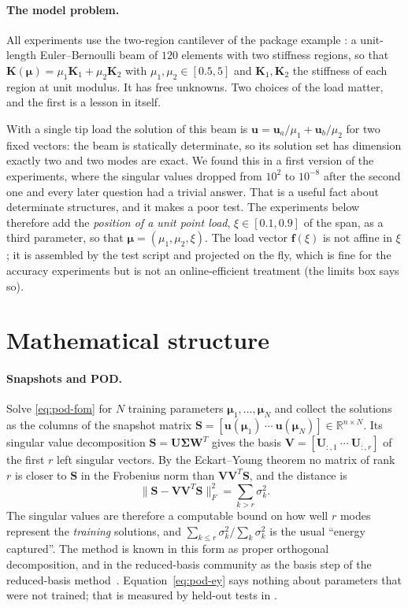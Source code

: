 \paragraph{The model problem.}
All experiments use the two-region cantilever of the package example : a unit-length Euler--Bernoulli beam of $120$ elements with two stiffness regions, so that $\bm K(\bm\mu)=\mu_1\bm K_1+\mu_2\bm K_2$ with $\mu_1,\mu_2\in[0.5,5]$ and $\bm K_1,\bm K_2$ the stiffness of each region at unit modulus. It has \cpdNFree free unknowns. Two choices of the load matter, and the first is a lesson in itself.

With a single tip load the solution of this beam is $\bm u=\bm u_a/\mu_1+\bm u_b/\mu_2$ for two fixed vectors: the beam is statically determinate, so its solution set has dimension exactly two and two modes are exact. We found this in a first version of the experiments, where the singular values dropped from $10^{2}$ to $10^{-8}$ after the second one and every later question had a trivial answer. That is a useful fact about determinate structures, and it makes a poor test. The experiments below therefore add the \emph{position of a unit point load}, $\xi\in[0.1,0.9]$ of the span, as a third parameter, so that $\bm\mu=(\mu_1,\mu_2,\xi)$. The load vector $\bm f(\xi)$ is not affine in $\xi$; it is assembled by the test script and projected on the fly, which is fine for the accuracy experiments but is not an online-efficient treatment (the limits box says so).

\section{Mathematical structure}\label{sec:pod-math}

\paragraph{Snapshots and POD.}
Solve \eqref{eq:pod-fom} for $N$ training parameters $\bm\mu_1,\dots,\bm\mu_N$ and collect the solutions as the columns of the snapshot matrix $\bm S=[\bm u(\bm\mu_1)\ \cdots\ \bm u(\bm\mu_N)]\in\mathbb R^{n\times N}$. Its singular value decomposition $\bm S=\bm U\bm\Sigma\bm W^T$ gives the basis $\bm V=[\bm U_{:,1}\ \cdots\ \bm U_{:,r}]$ of the first $r$ left singular vectors. By the Eckart--Young theorem no matrix of rank $r$ is closer to $\bm S$ in the Frobenius norm than $\bm V\bm V^T\bm S$, and the distance is
\begin{equation}\label{eq:pod-ey}
\|\bm S-\bm V\bm V^T\bm S\|_F^2=\sum_{k>r}\sigma_k^2 .
\end{equation}
The singular values are therefore a computable bound on how well $r$ modes represent the \emph{training} solutions, and $\sum_{k\le r}\sigma_k^2/\sum_k\sigma_k^2$ is the usual ``energy captured''. The method is known in this form as proper orthogonal decomposition, and in the reduced-basis community as the basis step of the reduced-basis method~\cite{berkooz1993pod,hesthaven2016rb}. Equation~\eqref{eq:pod-ey} says nothing about parameters that were not trained; that is measured by held-out tests in .

